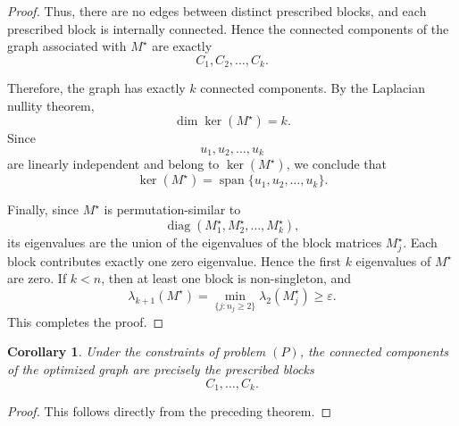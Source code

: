 \documentclass[11pt]{article}
\newtheorem{corollary}[theorem]{Corollary}
\begin{document}
\begin{proof}
	Thus, there are no edges between distinct prescribed blocks, and each prescribed block is internally connected. Hence the connected components of the graph associated with $M^\star$ are exactly
	\[
	C_1,C_2,\ldots,C_k.
	\]
	
	Therefore, the graph has exactly $k$ connected components. By the Laplacian nullity theorem,
	\[
	\dim\ker(M^\star)=k.
	\]
	Since
	\[
	u_1,u_2,\ldots,u_k
	\]
	are linearly independent and belong to $\ker(M^\star)$, we conclude that
	\[
	\ker(M^\star)
	=
	\operatorname{span}\{u_1,u_2,\ldots,u_k\}.
	\]
	
	Finally, since $M^\star$ is permutation-similar to
	\[
	\operatorname{diag}(M^\star_1,M^\star_2,\ldots,M^\star_k),
	\]
	its eigenvalues are the union of the eigenvalues of the block matrices $M^\star_j$. Each block contributes exactly one zero eigenvalue. Hence the first $k$ eigenvalues of $M^\star$ are zero. If $k<n$, then at least one block is non-singleton, and
	\[
	\lambda_{k+1}(M^\star)
	=
	\min_{\{j:n_j\ge2\}}\lambda_2(M^\star_j)
	\ge
	\varepsilon.
	\]
	This completes the proof.
\end{proof}

\begin{corollary}
	Under the constraints of problem $(P)$, the connected components of the optimized graph are precisely the prescribed blocks
	\[
	C_1,\ldots,C_k.
	\]
\end{corollary}

\begin{proof}
	This follows directly from the preceding theorem.
\end{proof}
	
\end{document}
